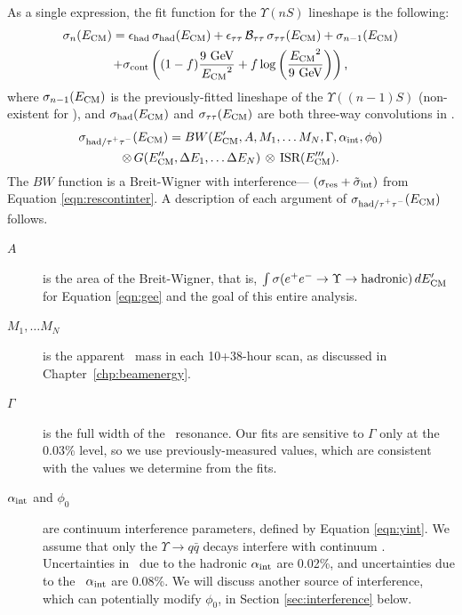 \documentclass{cornell}
\begin{document}
As a single expression, the fit function for the $\Upsilon(nS)$
lineshape is the following:
\begin{multline}
  \sigma_n(E_{\mbox{\scriptsize CM}}) = \epsilon_{\mbox{\scriptsize had}} \, \sigma_{\mbox{\scriptsize had}}(E_{\mbox{\scriptsize CM}}) +
  \epsilon_{\tau\tau} \, {\mathcal B}_{\tau\tau} \, \sigma_{\tau\tau}(E_{\mbox{\scriptsize CM}}) +
  \sigma_{n-1}(E_{\mbox{\scriptsize CM}}) \\
  + \sigma_{\mbox{\scriptsize cont}} \left((1-f) \frac{\mbox{9 GeV}}{{E_{\mbox{\scriptsize CM}}}^2}
  + f \log\left(\frac{{E_{\mbox{\scriptsize CM}}}^2}{\mbox{9 GeV}}\right)\right) \mbox{,}
  \label{eqn:fitfunc}
\end{multline}
where $\sigma_{n-1}(E_{\mbox{\scriptsize CM}})$ is the previously-fitted lineshape
of the $\Upsilon((n-1)S)$ (non-existent for \us), and
$\sigma_{\mbox{\scriptsize had}}(E_{\mbox{\scriptsize CM}})$ and $\sigma_{\tau\tau}(E_{\mbox{\scriptsize CM}})$
are both three-way convolutions in \ecm.
\begin{multline}
  \sigma_{\mbox{\scriptsize had/$\tau^+\tau^-$}}(E_{\mbox{\scriptsize CM}}) = BW(E_{\mbox{\scriptsize CM}}', A, M_1, \ldots M_N, \Gamma,
  \alpha_{\mbox{\scriptsize int}}, \phi_0) \\ \otimes \, G(E_{\mbox{\scriptsize CM}}'', \Delta E_1, \ldots \Delta E_N)
  \, \otimes \, \mbox{ISR}(E_{\mbox{\scriptsize CM}}''') \mbox{.}
\end{multline}
The $BW$ function is a Breit-Wigner with interference---
$(\sigma_{\mbox{\scriptsize res}}+\tilde{\sigma}_{\mbox{\scriptsize int}})$ from Equation
\ref{eqn:rescontinter}.  A description of each argument of
$\sigma_{\mbox{\scriptsize had/$\tau^+\tau^-$}}(E_{\mbox{\scriptsize CM}})$ follows.
\begin{description}

  \item[\boldmath $A$] is the area of the Breit-Wigner, that is, $\int \sigma(e^+e^-
    \to \Upsilon \to \mbox{hadronic}) \, dE_{\mbox{\scriptsize CM}}'$ for Equation
    \ref{eqn:gee} and the goal of this entire analysis.

  \item[\boldmath $M_1, \ldots M_N$] is the apparent \ups\ mass in each 10+38-hour
    scan, as discussed in Chapter~\ref{chp:beamenergy}.

  \item[\boldmath $\Gamma$] is the full width of the \ups\ resonance.
    Our fits are sensitive to $\Gamma$ only at the 0.03\% level, so we
    use previously-measured values, which are consistent with the
    values we determine from the fits.

  \item[\boldmath $\alpha_{\mbox{\scriptsize int}}$ and $\phi_0$] are continuum
    interference parameters, defined by Equation \ref{eqn:yint}.  We
    assume that only the $\Upsilon \to q\bar{q}$ decays interfere with
    continuum \qqbar.  Uncertainties in \geehadtot\ due to the
    hadronic $\alpha_{\mbox{\scriptsize int}}$ are 0.02\%, and uncertainties due to the
    \tautau\ $\alpha_{\mbox{\scriptsize int}}$ are 0.08\%.  We will discuss another
    source of interference, which can potentially modify $\phi_0$, in
    Section \ref{sec:interference} below.

\end{description}
\end{document}
